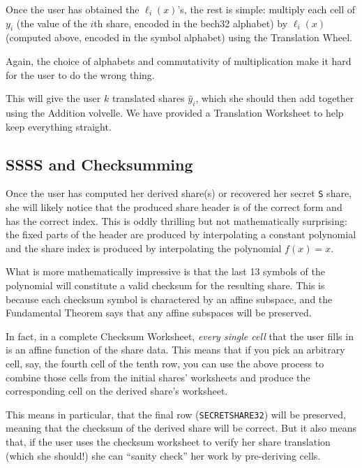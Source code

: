 \documentclass[letterpaper]{article}
\newcommand{\vc}[1]{\texttt{#1}} %
\begin{document}
Once the user has obtained the $\ell_i(x)$'s, the rest is simple: multiply each
cell of $y_i$ (the value of the $i$th share, encoded in the bech32 alphabet) by
$\ell_i(x)$ (computed above, encoded in the symbol alphabet) using the Translation
Wheel.

Again, the choice of alphabets and commutativity of multiplication make it hard
for the user to do the wrong thing.

This will give the user $k$ translated shares $\hat{y}_i$, which she should then
add together using the Addition volvelle. We have provided a Translation Worksheet
to help keep everything straight.

\subsection{SSSS and Checksumming}

Once the user has computed her derived share(s) or recovered her secret \vc{S}
share, she will likely notice that the produced share header is of the correct form
and has the correct index. This is oddly thrilling but not mathematically surprising:
the fixed parts of the header are produced by interpolating a constant polynomial
and the share index is produced by interpolating the polynomial $f(x) = x$.

What is more mathematically impressive is that the last 13 symbols of the polynomial
will constitute a valid checksum for the resulting share. This is because each checksum
symbol is charactered by an affine subspace, and the Fundamental Theorem says that
any affine subspaces will be preserved.

In fact, in a complete Checksum Worksheet, \emph{every single cell} that the user
fills in is an affine function of the share data. This means that if you pick an
arbitrary cell, say, the fourth cell of the tenth row, you can use the above process
to combine those cells from the initial shares' worksheets and produce the
corresponding cell on the derived share's worksheet.

This means in particular, that the final row (\vc{SECRETSHARE32}) will be
preserved, meaning that the checksum of the derived share will be correct. But it
also means that, if the user uses the checksum worksheet to verify her share
translation (which she should!) she can ``sanity check'' her work by pre-deriving
cells.
\end{document}
